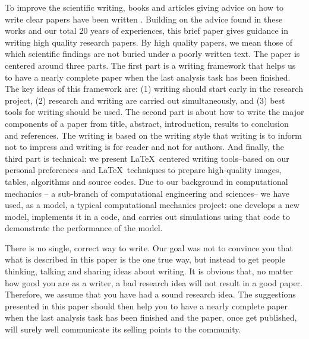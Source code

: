 \documentclass[authoryear,12pta4paper,fleqn]{article}
\numberwithin{equation}{section}
\theoremstyle{remark}
\begin{document}
To improve the scientific writing, books and articles giving advice on how to write clear papers have been written \citep{strunk2007elements,day1998write,ashby2000write,plaxco2010art,gewin2018write}. Building on the advice found in these works and our total 20 years of experiences, this brief paper gives guidance in writing high quality research papers. By high quality papers, we mean those of which scientific findings are not buried under a poorly written text. The paper is centered around three parts. 
The first part is a writing framework that helps us to have a nearly complete paper when the last analysis task has been finished.  The key ideas of this framework are: (1) writing should start early in the research project, (2) research and writing are carried out simultaneously, and (3) best tools for writing should be used.  The second part is about   how to  write the major components of a paper from title, abstract, introduction, results to conclusion and references. The writing is based on the writing style that writing is to inform not to impress and writing is for reader and not for authors. And  finally, the third part is technical:  we present \LaTeX\ centered writing tools--based on our personal preferences--and  \LaTeX\ techniques  to prepare high-quality images, tables, algorithms and source codes. Due to our background in computational mechanics -- a sub-branch of computational engineering and sciences-- we have used, as a model, a typical computational mechanics project: one develops a new model, implements it in a code, and carries out simulations using that code to demonstrate the performance of the model. 



There is no single, correct way to write.  Our goal was not to convince you that what is described in this paper is the one true way, but instead to get people thinking, talking and sharing ideas about writing. It is obvious that, no matter how good you are as a writer, a bad research idea will not result in a good paper. Therefore, we  assume that you have had a  sound research idea. The suggestions presented in this paper should then help you to have a nearly complete paper when the last analysis task has been finished and the paper, once get published, will surely well communicate its selling points to the community.
\end{document}
